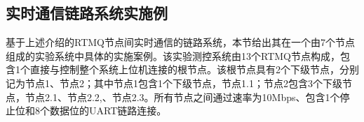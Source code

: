 













\subsection[实时通信链路系统实施例]{实时通信链路系统实施例}

基于上述介绍的RTMQ节点间实时通信的链路系统，本节给出其在一个由7个节点组成的实验系统中具体的实施案例。该实验测控系统由13个RTMQ节点构成，包含1个直接与控制整个系统上位机连接的根节点。该根节点具有2个下级节点，分别记为节点1、节点2；其中节点1包含1个下级节点，节点1.1；节点2包含3个下级节点，节点2.1、节点2.2,、节点2.3。所有节点之间通过速率为10Mbps、包含1个停止位和8个数据位的UART链路连接。

